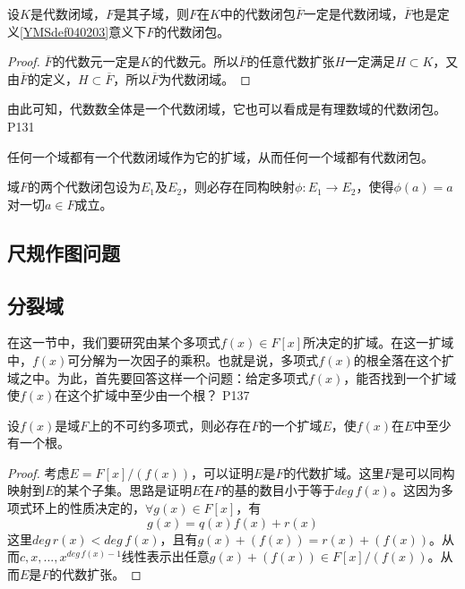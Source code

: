 \begin{theorem}
	设$K$是代数闭域，$F$是其子域，则$F$在$K$中的代数闭包$\overline{F}$一定是代数闭域，$\overline{F}$也是定义\ref{YMSdef040203}意义下$F$的代数闭包。
\end{theorem}

\begin{proof}
	$\overline{F}$的代数元一定是$K$的代数元。所以$\overline{F}$的任意代数扩张$H$一定满足$H\subset K$，又由$\overline{F}$的定义，$H\subset \overline{F}$，所以$\overline{F}$为代数闭域。
\end{proof}

\original
{
	由此可知，代数数全体是一个代数闭域，它也可以看成是有理数域的代数闭包。
}
{P131}

\begin{theorem}
	任何一个域都有一个代数闭域作为它的扩域，从而任何一个域都有代数闭包。
\end{theorem}


\begin{theorem}
	域$F$的两个代数闭包设为$E_{1}$及$E_{2}$，则必存在同构映射$\phi:E_{1}\rightarrow E_{2}$，使得$\phi(a)=a$对一切$a\in F$成立。
\end{theorem}

\subsection{尺规作图问题}



\subsection{分裂域}

\original
{
	在这一节中，我们要研究由某个多项式$f(x)\in F[x]$所决定的扩域。在这一扩域中，$f(x)$可分解为一次因子的乘积。也就是说，多项式$f(x)$的根全落在这个扩域之中。为此，首先要回答这样一个问题：给定多项式$f(x)$，能否找到一个扩域使$f(x)$在这个扩域中至少由一个根？
}
{P137}

\begin{lemma}
	设$f(x)$是域$F$上的不可约多项式，则必存在$F$的一个扩域$E$，使$f(x)$在$E$中至少有一个根。
\end{lemma}

\begin{proof}
	考虑$E=F[x]/(f(x))$，可以证明$E$是$F$的代数扩域。这里$F$是可以同构映射到$E$的某个子集。思路是证明$E$在$F$的基的数目小于等于$deg\, f(x)$。这因为多项式环上的性质决定的，$\forall g(x)\in F[x]$，有
	\begin{equation*}
		g(x)=q(x)f(x)+r(x)
	\end{equation*}
	这里$deg\,r(x)< deg\,f(x) $，且有$g(x)+(f(x))=r(x)+(f(x))$。从而$c,x,...,x^{deg\,f(x)-1}$线性表示出任意$g(x)+(f(x))\in  F[x]/(f(x))$。从而$E$是$F$的代数扩张。
\end{proof}

